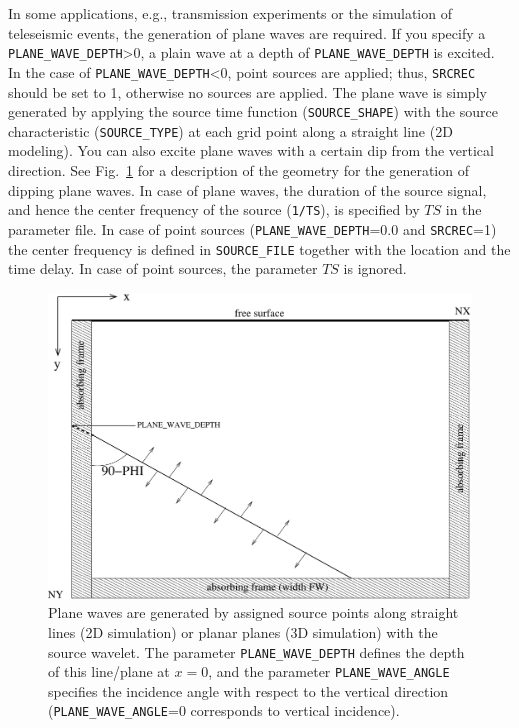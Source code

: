 In some applications, e.g., transmission experiments or the simulation of teleseismic events, the generation of plane waves are required. If you specify a \texttt{PLANE\_WAVE\_DEPTH}>0, a plain wave at a depth of \texttt{PLANE\_WAVE\_DEPTH} is excited. In the case of \texttt{PLANE\_WAVE\_DEPTH}<0, point sources are applied; thus, \texttt{SRCREC} should be set to 1, otherwise no sources are applied. The plane wave is simply generated by applying the source time function (\texttt{SOURCE\_SHAPE}) with the source characteristic (\texttt{SOURCE\_TYPE}) at each grid point along a straight line (2D modeling). You can also excite plane waves with a certain dip from the vertical direction. See Fig.~\ref{fig_plane_wave} for a description of the geometry for the generation of dipping plane waves. In case of plane waves, the duration of the source signal, and hence the center frequency of the source (\texttt{1/TS}), is specified by $TS$ in the parameter file. In case of point sources (\texttt{PLANE\_WAVE\_DEPTH}=0.0 and \texttt{SRCREC}=1) the center frequency is defined in \texttt{SOURCE\_FILE} together with the location and the time delay. In case of point sources, the parameter $TS$ is ignored.
\begin{figure}[ht!]
\centering
    \includegraphics[width=12cm,angle=0]{figures/plane_wave.pdf}
    \caption{Plane waves are generated by assigned source points along  straight lines (2D simulation) or planar planes (3D simulation) with the source wavelet. The parameter \texttt{PLANE\_WAVE\_DEPTH} defines the depth of this line/plane at $x=0$, and the parameter \texttt{PLANE\_WAVE\_ANGLE} specifies the incidence angle with respect to the vertical direction (\texttt{PLANE\_WAVE\_ANGLE}=0 corresponds to vertical incidence).}
    \label{fig_plane_wave}
\end{figure}

